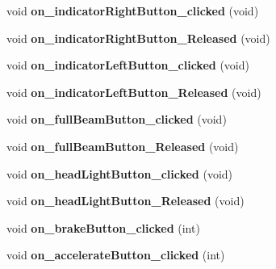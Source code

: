 \begin{DoxyCompactItemize}
\item 
\hypertarget{class_main_window_a700c75646dc095274f6243a3839103b0}{}void {\bfseries on\+\_\+indicator\+Right\+Button\+\_\+clicked} (void)\label{class_main_window_a700c75646dc095274f6243a3839103b0}

\item 
\hypertarget{class_main_window_a16b416264054c670d9d99a71557d6170}{}void {\bfseries on\+\_\+indicator\+Right\+Button\+\_\+\+Released} (void)\label{class_main_window_a16b416264054c670d9d99a71557d6170}

\item 
\hypertarget{class_main_window_ace1c4f24a9c967088bf0bdbe2e8c0016}{}void {\bfseries on\+\_\+indicator\+Left\+Button\+\_\+clicked} (void)\label{class_main_window_ace1c4f24a9c967088bf0bdbe2e8c0016}

\item 
\hypertarget{class_main_window_ac5b52146cdc9b0f800e297e6878e5b64}{}void {\bfseries on\+\_\+indicator\+Left\+Button\+\_\+\+Released} (void)\label{class_main_window_ac5b52146cdc9b0f800e297e6878e5b64}

\item 
\hypertarget{class_main_window_a83da26aea6092b16af47b168934d0b53}{}void {\bfseries on\+\_\+full\+Beam\+Button\+\_\+clicked} (void)\label{class_main_window_a83da26aea6092b16af47b168934d0b53}

\item 
\hypertarget{class_main_window_a6b9b4805bed75625acf7173ca1aa2b51}{}void {\bfseries on\+\_\+full\+Beam\+Button\+\_\+\+Released} (void)\label{class_main_window_a6b9b4805bed75625acf7173ca1aa2b51}

\item 
\hypertarget{class_main_window_ac42ccb3fdc4d023d24a96f6ef2b8a276}{}void {\bfseries on\+\_\+head\+Light\+Button\+\_\+clicked} (void)\label{class_main_window_ac42ccb3fdc4d023d24a96f6ef2b8a276}

\item 
\hypertarget{class_main_window_a85a881ef94e347bdd8272880ad62d625}{}void {\bfseries on\+\_\+head\+Light\+Button\+\_\+\+Released} (void)\label{class_main_window_a85a881ef94e347bdd8272880ad62d625}

\item 
\hypertarget{class_main_window_a9bd9f4929af22bf0b859941e8ed2138f}{}void {\bfseries on\+\_\+brake\+Button\+\_\+clicked} (int)\label{class_main_window_a9bd9f4929af22bf0b859941e8ed2138f}

\item 
\hypertarget{class_main_window_a0c692b460f19ba18bc73995e963cd153}{}void {\bfseries on\+\_\+accelerate\+Button\+\_\+clicked} (int)\label{class_main_window_a0c692b460f19ba18bc73995e963cd153}


\end{DoxyCompactItemize}
